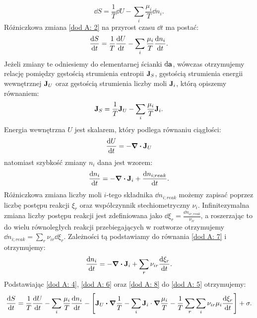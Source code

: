 \documentclass[10pt, a4paper, twoside, onecolumn]{article}
\numberwithin{equation}{section}
\begin{document}
	\begin{equation}
		\dd{S}=\frac{1}{T}\dd{U}-\sum_{i}\frac{\mu_{i}}{T}\dd{n_{i}}. \label{dod A: 2}
	\end{equation}
	Różniczkowa zmiana \eqref{dod A: 2} na przyrost czasu \(\dd{t}\) ma postać:
	\begin{equation}
		\dv{S}{t}=\frac{1}{T}\dv{U}{t}-\sum_{i}\frac{\mu_{i}}{T}\dv{n_{i}}{t}. \label{dod A: 3}
	\end{equation}
	Jeżeli zmiany te odniesiemy do elementarnej ścianki \(\dd{\vb{a}}\), wówczas otrzymujemy relację pomiędzy gęstością strumienia entropii \(\vb{J}_{S}\), gęstością strumienia energii wewnętrznej \(\vb{J}_{U}\) oraz gęstością strumienia liczby moli \(\vb{J}_{i}\), którą opiszemy równaniem:
	\begin{equation}
		\vb{J}_{S}=\frac{1}{T}\vb{J}_{U}-\sum_{i}\frac{\mu_{i}}{T}\vb{J}_{i}. \label{dod A: 4}
	\end{equation}
	Energia wewnętrzna $U$ jest skalarem, który podlega równaniu ciągłości:
	\begin{equation}
		\dv{U}{t}=-\div{\vb{J}_{U}} \label{dod A: 6}
	\end{equation}
	natomiast szybkość zmiany $n_{i}$ dana jest wzorem:
	\begin{equation}
		\dv{n_{i}}{t}=-\div{\vb{J}_{i}}+\dv{n_{i;reak}}{t}. \label{dod A: 7}
	\end{equation}
	Różniczkowa zmiana liczby moli $i$-tego składnika \(\dd{n_{i;reak}}\) możemy zapisać poprzez liczbę postępu reakcji $\xi_{r}$ oraz współczynnik stechiometryczny $\nu_{i}$. Infinitezymalna zmiana liczby postępu reakcji jest zdefiniowana jako \(\dd{\xi_{r}}=\frac{\dd{n_{ir;reak}}}{\nu_{ir}}\), a roszerzając to do wielu równoległych reakcji przebiegających w roztworze otrzymujemy \(\dd{n_{i;reak}}=\sum\limits_{r}\nu_{ir}\dd{\xi_{r}}\). Zależności tą podstawiamy do równania \eqref{dod A: 7} i otrzymujemy:
	\begin{equation}
		\dv{n_{i}}{t}=-\div{\vb{J}_{i}}+\sum_{r}\nu_{ir}\dv{\xi_{r}}{t}. \label{dod A: 8}
	\end{equation}
	Podstawiając \eqref{dod A: 4}, \eqref{dod A: 6} oraz \eqref{dod A: 8} do \eqref{dod A: 5} otrzymujemy: 
	\begin{equation} \label{dod A: 9}
		\dv{S}{t}=\frac{1}{T}\dv{U}{t}-\sum_{i}\frac{\mu_{i}}{T}\dv{n_{i}}{t}-\left[\vb{J}_{U}\vdot\grad{\frac{1}{T}}-\sum_{i}\vb{J}_{i}\cdot\grad{\frac{\mu_{i}}{T}}-\frac{1}{T}\sum_{r}\sum_{i}\nu_{ir}\mu_{i}\dv{\xi_{r}}{t}\right]+\sigma.
	\end{equation}
\end{document}
